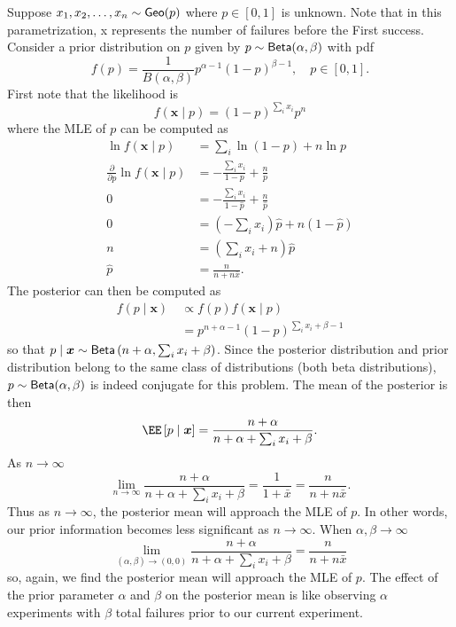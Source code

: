 \begin{exam} \label{exam: 2021_Q4}
    Suppose $x_1 , x_2 , \ldots , x_n \sim {\sf Geo} (p)$ where $p \in [0,1]$ is unknown. Note that in this parametrization, x represents the number
    of failures before the First success. Consider a prior distribution on $p$ given by $p \sim {\sf Beta} (\alpha , \beta)$ with pdf
    \[
        f(p) = \frac{1}{B(\alpha , \beta)} p^{\alpha - 1} (1-p)^{\beta - 1}, \quad p \in [0,1].
    \]
    First note that the likelihood is
    \[
        f(\bm{x} \mid p) = (1-p)^{\sum_i x_i} p^n
    \]
    where the MLE of $p$ can be computed as
    \begin{align*}
        \ln f(\bm{x} \mid p)                             & = \sum_i \ln (1-p) + n \ln p                         \\
        \frac{\partial}{\partial p} \ln f(\bm{x} \mid p) & = - \frac{\sum_i x_i}{1-p} + \frac{n}{p}             \\
        0                                                & = - \frac{\sum_i x_i}{1-\hat{p}} + \frac{n}{\hat{p}} \\
        0                                                & = (- \sum_i x_i) \hat{p} + n (1-\hat{p})             \\
        n                                                & = ( \sum_i x_i + n) \hat{p}                          \\
        \hat{p}                                          & = \frac{n}{n + n \bar{x}}.
    \end{align*}
    The posterior can then be computed as
    \begin{align*}
        f(p \mid \bm{x}) \
         & \propto f(p) f(\bm{x} \mid p)                       \\
         & = p^{n + \alpha - 1} (1-p)^{\sum_i x_i + \beta - 1}
    \end{align*}
    so that $p \mid \bm{x} \sim {\sf Beta} \left( n + \alpha , \sum_i x_i + \beta \right)$. Since the posterior distribution and prior distribution belong to the same class of distributions (both beta distributions), $p \sim {\sf Beta} (\alpha , \beta)$ is indeed conjugate for this problem. The mean of the posterior is then
    \[
        \EE \left[ p \mid \bm{x} \right] = \frac{n + \alpha}{n + \alpha + \sum_i x_i + \beta}.
    \]
    As $n \to \infty$
    \[
        \lim_{n \to \infty} \frac{n + \alpha}{n + \alpha + \sum_i x_i + \beta} = \frac{1}{1 + \bar{x}} = \frac{n}{n + n \bar{x}}.
    \]
    Thus as $n \to \infty$, the posterior mean will approach the MLE of $p$. In other words, our prior information becomes less significant as $n \to \infty$. When $\alpha , \beta \to \infty$
    \[
        \lim_{(\alpha , \beta) \to (0,0)} \frac{n + \alpha}{n + \alpha + \sum_i x_i + \beta} = \frac{n}{n + n \bar{x}}
    \]
    so, again, we find the posterior mean will approach the MLE of $p$. The effect of the prior parameter $\alpha$ and $\beta$ on the posterior mean is like observing $\alpha$ experiments with $\beta$ total failures prior to our current experiment.
\end{exam}

